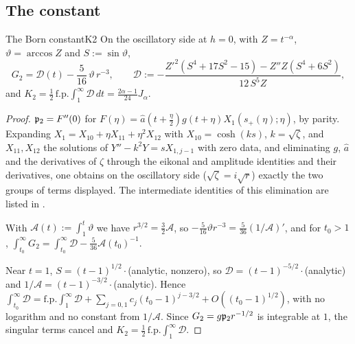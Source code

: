 \subsection{The constant}

\begin{proposition}{The Born constant}{K2}
On the oscillatory side at $h=0$, with $Z=t^{-\alpha}$, $\vartheta=\arccos Z$ and $S:=\sin\vartheta$,
\[
  G_2=\mathcal D(t)-\frac5{16}\,\vartheta\,r^{-3},\qquad
  \mathcal D:=-\frac{Z'^2(S^4+17S^2-15)-Z''Z(S^4+6S^2)}{12\,S^5Z},
\]
and $K_2=\frac12\,\mathrm{f.p.}\!\int_1^\infty \mathcal D\,dt=\frac{2\alpha-1}{24}J_\alpha$.
\end{proposition}

\begin{proof}
 $\mathfrak{p}_2=F''(0)$ for $F(\eta)=\hat a(t+\frac\eta2)g(t+\eta)X_1(s_+(\eta);\eta)$, by
parity. Expanding $X_1=X_{10}+\eta X_{11}+\eta^2X_{12}$ with $X_{10}=\cosh(ks)$, $k=\sqrt\zeta$, and
$X_{11},X_{12}$ the solutions of $Y''-k^2Y=sX_{1,j-1}$ with zero data, and eliminating $g$, $\hat a$
and the derivatives of $\zeta$ through the eikonal and amplitude identities and their
derivatives, one obtains on the oscillatory side ($\sqrt\zeta=i\sqrt r$) exactly the two groups
of terms displayed. The intermediate identities of this elimination are listed in .

 With $\mathcal A(t):=\int_1^t\vartheta$ we have $r^{3/2}=\frac32\mathcal A$, so
$-\frac5{16}\vartheta r^{-3}=\frac5{36}(1/\mathcal A)'$, and for $t_0>1$,
$\int_{t_0}^\infty G_2=\int_{t_0}^\infty \mathcal D-\frac5{36}\mathcal A(t_0)^{-1}$.

 Near $t=1$, $S=(t-1)^{1/2}\cdot$(analytic, nonzero), so $\mathcal D=(t-1)^{-5/2}\cdot$(analytic)
and $1/\mathcal A=(t-1)^{-3/2}\cdot$(analytic). Hence $\int_{t_0}^\infty \mathcal D=\mathrm{f.p.}\!\int_1^\infty \mathcal D+
\sum_{j=0,1}c_j(t_0-1)^{j-3/2}+O((t_0-1)^{1/2})$, with no logarithm and no constant from
$1/\mathcal A$. Since $G_2=g\mathfrak{p}_2r^{-1/2}$ is integrable at $1$, the singular terms cancel and
$K_2=\frac12\,\mathrm{f.p.}\!\int_1^\infty \mathcal D$.


\end{proof}
